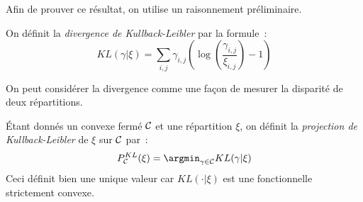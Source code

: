 Afin de prouver ce résultat, on utilise un raisonnement préliminaire.
\begin{definition}
On définit la \emph{divergence de Kullback-Leibler} par la formule~:
\begin{equation}\label{eq:kl}
KL(\gamma | \xi) = \sum_{i,j} \gamma_{i,j} \left(\log\left(\frac{\gamma_{i,j}}{\xi_{i,j}} \right) -1 \right)
\end{equation}
\end{definition}
On peut considérer la divergence comme une façon de mesurer la disparité de deux répartitions.
\begin{definition}
 \'Etant donnés un convexe fermé $\operatorname{\mathcal{C}}$ et une répartition $\xi$, on définit la \emph{projection de Kullback-Leibler} de $\xi$ sur $\operatorname{\mathcal{C}}$ par~:
\begin{equation}\label{eq:pkl}
P^{KL}_{\Ccal} (\xi) = \argmin_{\gamma \in \Ccal} KL(\gamma | \xi)
\end{equation}
Ceci définit bien une unique valeur car $KL(\cdot | \xi)$ est une fonctionnelle strictement convexe.
\end{definition}


